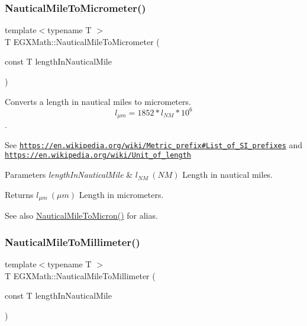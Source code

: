 \subsubsection{\texorpdfstring{Nautical\+Mile\+To\+Micrometer()}{NauticalMileToMicrometer()}}
{\footnotesize\ttfamily template$<$typename T $>$ \\
T E\+G\+X\+Math\+::\+Nautical\+Mile\+To\+Micrometer (\begin{DoxyParamCaption}\item[{const T}]{length\+In\+Nautical\+Mile }\end{DoxyParamCaption})}



Converts a length in nautical miles to micrometers. \[ l_{\mu m}=1852 * l_{NM} * 10^{6} \]. 

See \href{https://en.wikipedia.org/wiki/Metric_prefix#List_of_SI_prefixes}{\tt https\+://en.\+wikipedia.\+org/wiki/\+Metric\+\_\+prefix\#\+List\+\_\+of\+\_\+\+S\+I\+\_\+prefixes} and \href{https://en.wikipedia.org/wiki/Unit_of_length}{\tt https\+://en.\+wikipedia.\+org/wiki/\+Unit\+\_\+of\+\_\+length} 
\begin{DoxyParams}{Parameters}
{\em length\+In\+Nautical\+Mile} & $ l_{NM}\ (NM)$ Length in nautical miles. \\
\hline
\end{DoxyParams}
\begin{DoxyReturn}{Returns}
$ l_{\mu m}\ (\mu m)$ Length in micrometers. 
\end{DoxyReturn}
\begin{DoxySeeAlso}{See also}
\mbox{\hyperlink{group___e_g_x_math-_conversions-_length_conversions-_nautical-_nautical_mile-_non-_s_i_gad80a4f8f82660ad19a420e55bfb33447}{Nautical\+Mile\+To\+Micron()}} for alias. 
\end{DoxySeeAlso}
\mbox{\label{group___e_g_x_math-_conversions-_length_conversions-_nautical-_nautical_mile-_s_i_ga10840f2eeeb3fe428db89373cb306246}} 
\subsubsection{\texorpdfstring{Nautical\+Mile\+To\+Millimeter()}{NauticalMileToMillimeter()}}
{\footnotesize\ttfamily template$<$typename T $>$ \\
T E\+G\+X\+Math\+::\+Nautical\+Mile\+To\+Millimeter (\begin{DoxyParamCaption}\item[{const T}]{length\+In\+Nautical\+Mile }\end{DoxyParamCaption})}



